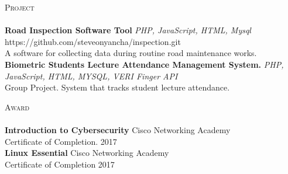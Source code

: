 \documentclass[a4paper]{article}
\newcommand{\lineunder} {
    \vspace*{-8pt} \\
    \hspace*{-18pt} \hrulefill \\
}
\newcommand{\header} [1] {
    {\hspace*{-18pt}\vspace*{6pt} \textsc{#1}}
    \vspace*{-6pt} \lineunder
}
\begin{document}
\header{Project}
{\textbf{Road Inspection Software Tool}} {\sl PHP, JavaScript, HTML, Mysql} \hfill https://github.com/steveonyancha/inspection.git\\
A software for collecting data during routine road maintenance works.\\
\vspace*{2mm}
{\textbf{Biometric Students Lecture Attendance Management System.}} {\sl PHP, JavaScript, HTML, MYSQL, VERI Finger API} \\
Group Project. System that tracks student lecture attendance.\\
\vspace*{2mm}

\header{Award}
\textbf{Introduction to Cybersecurity} \hfill Cisco Networking Academy\\
Certificate of Completion. \hfill 2017\\
\vspace*{2mm}
\textbf{Linux Essential} \hfill Cisco Networking Academy\\
Certificate of Completion \hfill 2017\\
\vspace*{2mm}

\ 
\end{document}

